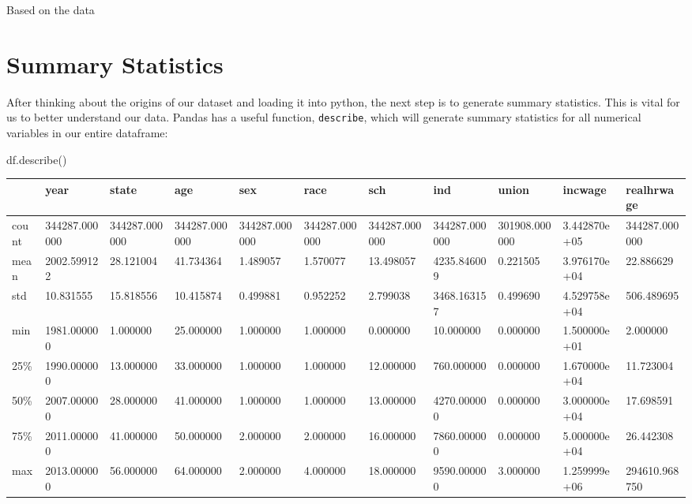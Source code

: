 \documentclass[
  letterpaper,
  DIV=11,
  numbers=noendperiod]{scrreprt}
\newenvironment{Shaded}{\begin{snugshade}}{\end{snugshade}}
\newcommand{\NormalTok}[1]{\textcolor[rgb]{0.00,0.23,0.31}{#1}}
\begin{document}
Based on the data

\hypertarget{summary-statistics}{%
\section{Summary Statistics}\label{summary-statistics}}

After thinking about the origins of our dataset and loading it into
python, the next step is to generate summary statistics. This is vital
for us to better understand our data. Pandas has a useful function,
\texttt{describe}, which will generate summary statistics for all
numerical variables in our entire dataframe:

\begin{Shaded}
\begin{Highlighting}[]
\NormalTok{df.describe()}
\end{Highlighting}
\end{Shaded}

\begin{longtable}[]{@{}lllllllllll@{}}
\toprule()
& year & state & age & sex & race & sch & ind & union & incwage &
realhrwage \\
\midrule()
\endhead
count & 344287.000000 & 344287.000000 & 344287.000000 & 344287.000000 &
344287.000000 & 344287.000000 & 344287.000000 & 301908.000000 &
3.442870e+05 & 344287.000000 \\
mean & 2002.599122 & 28.121004 & 41.734364 & 1.489057 & 1.570077 &
13.498057 & 4235.846009 & 0.221505 & 3.976170e+04 & 22.886629 \\
std & 10.831555 & 15.818556 & 10.415874 & 0.499881 & 0.952252 & 2.799038
& 3468.163157 & 0.499690 & 4.529758e+04 & 506.489695 \\
min & 1981.000000 & 1.000000 & 25.000000 & 1.000000 & 1.000000 &
0.000000 & 10.000000 & 0.000000 & 1.500000e+01 & 2.000000 \\
25\% & 1990.000000 & 13.000000 & 33.000000 & 1.000000 & 1.000000 &
12.000000 & 760.000000 & 0.000000 & 1.670000e+04 & 11.723004 \\
50\% & 2007.000000 & 28.000000 & 41.000000 & 1.000000 & 1.000000 &
13.000000 & 4270.000000 & 0.000000 & 3.000000e+04 & 17.698591 \\
75\% & 2011.000000 & 41.000000 & 50.000000 & 2.000000 & 2.000000 &
16.000000 & 7860.000000 & 0.000000 & 5.000000e+04 & 26.442308 \\
max & 2013.000000 & 56.000000 & 64.000000 & 2.000000 & 4.000000 &
18.000000 & 9590.000000 & 3.000000 & 1.259999e+06 & 294610.968750 \\
\bottomrule()
\end{longtable}
\end{document}

